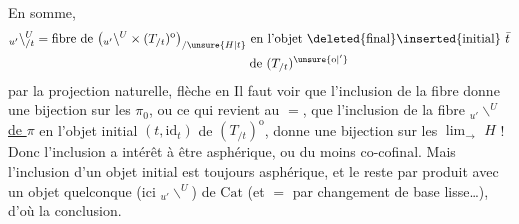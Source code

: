 En somme,
\[
\begin{aligned}
{}_{u'}\backslash^{U}_{/t}&=\text{fibre de }\bigl({}_{u'}\backslash^{U}\times(T_{/t})^{\mathrm o}\bigr)_{/\unsure{H|t}}
\text{ en l'objet \deleted{final}\inserted{initial} }\bar t\\
&\hspace{17em}\text{de }(T_{/t})^{\unsure{\mathrm o|'}}
\end{aligned}
\]
par la projection naturelle, flèche en
Il faut voir que l'inclusion de la fibre donne
une bijection sur les $\pi_0$, ou ce qui revient
au $=$, que l'inclusion de la fibre
$\mathord{}_{u'}\backslash^{U}$ \uline{de $\pi$} en l'objet initial $(t,\mathrm{id}_t)$ de $(T_{/t})^{\mathrm o}$,
donne une bijection sur les $\lim_{\rightarrow}$ 
 $H$ !\unsure{!} Donc l'inclusion a intérêt
à être asphérique, ou du moins co-cofinal.
Mais l'inclusion d'un objet initial est toujours
asphérique, et le reste par produit avec un
objet quelconque (ici $\mathord{}_{u'}\backslash^{U}$) de $\mathrm{Cat}$
(et $=$ par  changement de base lisse\ldots),
d'où la conclusion. \unsure{$\backslash$}

